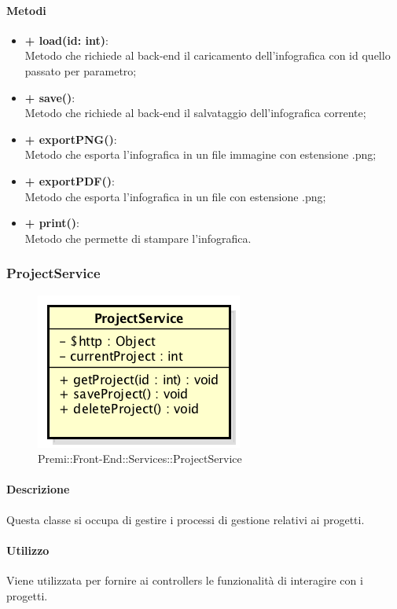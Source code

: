 	\paragraph{Metodi}
	\begin{itemize}
		\item \textbf{+ load(id: int)}:\\
		Metodo che richiede al back-end il caricamento dell'infografica con id quello passato per parametro;
		\item \textbf{+ save()}:\\
		Metodo che richiede al back-end il salvataggio dell'infografica corrente;
		\item \textbf{+ exportPNG()}:\\
		Metodo che esporta l'infografica in un file immagine con estensione .png;
		\item \textbf{+ exportPDF()}:\\
		Metodo che esporta l'infografica in un file con estensione .png;
		\item \textbf{+ print()}:\\
		Metodo che permette di stampare l'infografica.
	\end{itemize}
	
	
\subsubsection{ProjectService}
	\begin{figure}[h]
		\centering
		\includegraphics[width=0.4\linewidth]{img/premi_front_end_services_projectservice}
		\caption[Premi::Front-End::Services::ProjectService]{Premi::Front-End::Services::ProjectService}
	\end{figure}
	
	\paragraph{Descrizione}
	Questa classe si occupa di gestire i processi di gestione relativi ai progetti.
	
	\paragraph{Utilizzo}
	Viene utilizzata per fornire ai controllers le funzionalità di interagire con i progetti.
	
